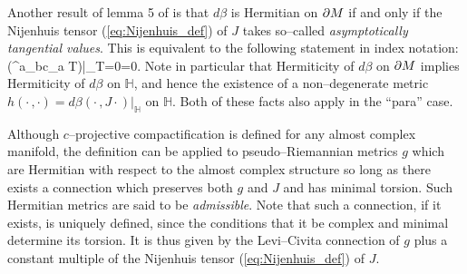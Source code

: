 Another result of lemma 5 of \cite{CG} is that $d\beta$ is Hermitian on $\partial M$ if and only if the Nijenhuis tensor (\ref{eq:Nijenhuis_def}) of $J$ takes so--called \textit{asymptotically tangential values}. This is equivalent to the following statement in index notation:
\be
\label{Nijenhuis_condition}
\Big({^{a}}_{bc}\nabla_a T\Big)\Big|_{T=0}=0.  \ee
Note in particular that Hermiticity of $d\beta$ on $\partial M$ implies Hermiticity of $d\beta$ on $ \mathbb{H} $, and hence the existence of a non--degenerate metric $h(\cdot\,,\cdot)=d\beta(\cdot\,,J\cdot)|_ \mathbb{H} $ on $ \mathbb{H} $. Both of these facts also apply in the ``para'' case.


Although $c$--projective compactification is defined for any almost complex manifold, the definition can be applied to pseudo--Riemannian metrics $g$ which are Hermitian with respect to the almost complex structure so long as there exists a connection which preserves both $g$ and $J$ and has minimal torsion. Such Hermitian metrics are said to be \textit{admissible}.  Note that such a connection, if it exists, is uniquely defined, since the conditions that it be complex and minimal determine its torsion. It is thus given by the Levi--Civita connection of $g$ plus a constant multiple of the Nijenhuis tensor (\ref{eq:Nijenhuis_def}) of $J$.

